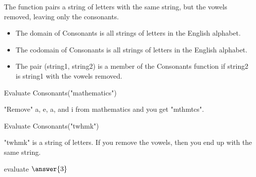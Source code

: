 \documentclass{ximera}
\begin{document}
\begin{definition}
  The function  pairs a string of letters with the same string, but the vowels removed, leaving only the consonants.
 
    \begin{itemize}
    \item The domain of Consonants is all strings of letters in the English alphabet.
    \item The codomain of Consonants is all strings of letters in the English alphabet.
    \item The pair (string1, string2) is a member of the Consonants function if string2 is string1 with the vowels removed.
    \end{itemize}

  
\end{definition}



\begin{exercise}

 Evaluate Consonants("mathematics")

  \begin{multipleChoice}
  \end{multipleChoice}
  \begin{feedback}
"Remove" a, e, a, and i from mathematics and you get "mthmtcs".
  \end{feedback}
\end{exercise}



\begin{exercise}

 Evaluate Consonants("twhmk")

  \begin{multipleChoice}
  \end{multipleChoice}
  \begin{feedback}
"twhmk" is a string of letters. If you remove the vowels, then you end up with the same string.
  \end{feedback}
\end{exercise}


\begin{exercise}
evaluate $\answer{3}$
\end{exercise}
\end{document}
